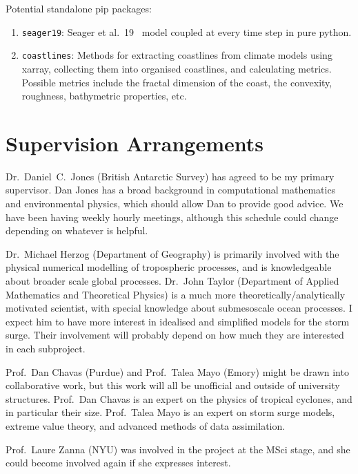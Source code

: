 \documentclass[usenames, dvipsnames]{article}      %
\begin{document}
Potential standalone pip packages:

\begin{enumerate}
    \item \texttt{seager19}: Seager et al.~19~\cite{seager2019strengthening} model coupled at every time step in pure python.
    \item \texttt{coastlines}:
    Methods for extracting coastlines from climate models using xarray, 
    collecting them into organised coastlines, and calculating metrics.
    Possible metrics include the fractal dimension of the coast,
    the convexity, roughness, bathymetric properties, etc.
\end{enumerate}

\section{Supervision Arrangements}

Dr.~Daniel~C.~Jones (British Antarctic Survey) has agreed to be my primary
supervisor. Dan Jones has a broad background in computational mathematics and 
environmental physics, which should allow Dan to provide good advice.
We have been having weekly hourly meetings, although this schedule could
change depending on whatever is helpful.

Dr.~Michael Herzog (Department of Geography) is primarily involved with 
the physical numerical modelling of tropospheric processes, and is
knowledgeable about broader scale global processes.
Dr.~John Taylor (Department of Applied Mathematics and Theoretical Physics)
is a much more theoretically/analytically motivated scientist,
with special knowledge about submesoscale ocean processes.
I expect him to have more interest in idealised and simplified
models for the storm surge.
Their involvement will probably depend on how much they are 
interested in each subproject.

Prof.~Dan Chavas (Purdue) and Prof.~Talea Mayo (Emory) might
be drawn into collaborative work,
but this work will all be unofficial and outside of university structures.
Prof.~Dan Chavas is an expert on the physics of tropical cyclones, and in 
particular their size. Prof.~Talea Mayo is an expert on storm surge models,
extreme value theory, and advanced methods of data assimilation.

Prof.~Laure Zanna (NYU) was involved in the project at the MSci stage, and she could
become involved again if she expresses interest.
\end{document}
